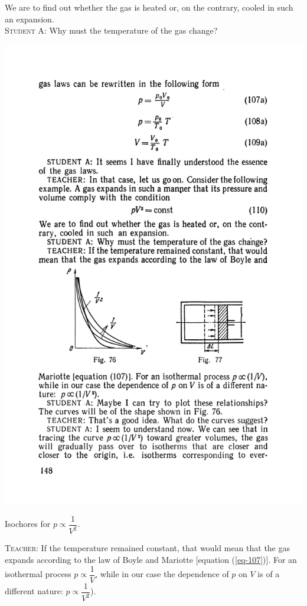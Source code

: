 \documentclass[a4paper,sfsidenotes]{tufte-book}
\begin{document}
We are to find out whether the gas is heated or, on the contrary, cooled in such an expansion.
\\
\textsc{Student A:} Why must the temperature of the gas change?
\\
\begin{marginfigure}
\centering
\includegraphics[width=\linewidth]{fig-076a}
\caption{Isochores for $p \propto \dfrac{1}{V^{2}}$.}
\label{fig-76}
\end{marginfigure}
\textsc{Teacher:} If the temperature remained constant, that would mean that the gas expands according to the law of Boyle and Mariotte [equation (\ref{eq-107})]. For an isothermal process $p \propto \dfrac{1}{V}$, while in our case the dependence of $p$ on $V$ is of a different nature: $p \propto \dfrac{1}{V^{2}}$).
\end{document}
